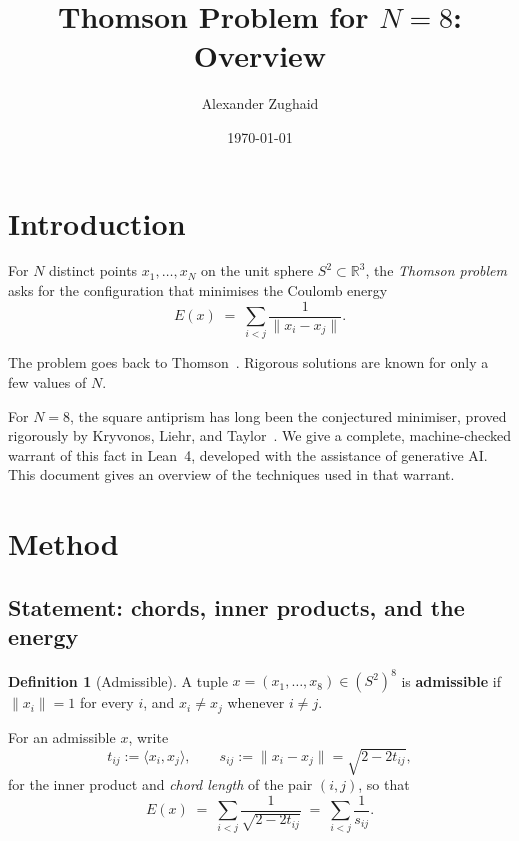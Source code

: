 \documentclass[11pt]{article}
\title{Thomson Problem for $N=8$: Overview}
\author{Alexander Zughaid}
\date{\today}
\theoremstyle{definition}
\newtheorem{definition}[theorem]{Definition}
\theoremstyle{remark}
\newcommand{\RR}{\mathbb{R}}
\newcommand{\energy}{E}
\begin{document}
\maketitle

\section{Introduction}
\label{sec:introduction}

For $N$ distinct points $x_1,\dots,x_N$ on the unit sphere $S^2\subset\RR^3$,
the \emph{Thomson problem} asks for the configuration that minimises the
Coulomb energy
\begin{equation}
  \energy(x) \;=\; \sum_{i<j} \frac{1}{\lVert x_i - x_j\rVert}.
\end{equation}

The problem goes back to Thomson~\cite{Tho04}. Rigorous solutions are
known for only a few values of $N$.

For $N=8$, the square antiprism has long been the conjectured minimiser, proved rigorously by Kryvonos, Liehr, and Taylor~\cite{KLT26}. We
give a complete, machine-checked warrant of this fact in Lean~4, developed
with the assistance of generative AI. This document gives an overview of
the techniques used in that warrant.

\section{Method}
\label{sec:method}

\subsection{Statement: chords, inner products, and the energy}
\label{sec:method-statement}

\begin{definition}[Admissible]
A tuple $x=(x_1,\dots,x_8)\in(S^2)^8$ is \textbf{admissible} if
$\lVert x_i\rVert=1$ for every $i$, and $x_i\ne x_j$ whenever $i\ne j$.
\end{definition}

For an admissible $x$, write
\begin{equation}
  t_{ij} := \langle x_i, x_j \rangle, \qquad
  s_{ij} := \lVert x_i - x_j \rVert = \sqrt{2 - 2t_{ij}},
\end{equation}
for the inner product and \emph{chord length} of the pair $(i,j)$, so that
\begin{equation}
  \energy(x) \;=\; \sum_{i<j} \frac{1}{\sqrt{2-2t_{ij}}} \;=\; \sum_{i<j} \frac{1}{s_{ij}}.
\end{equation}
\end{document}
